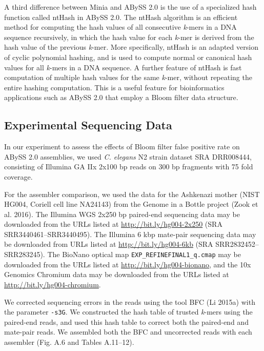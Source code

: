 \documentclass[
  12pt,
  oneside,
  openany]{book}
\begin{document}
A third difference between Minia and ABySS 2.0 is the use of a specialized hash function called ntHash in ABySS 2.0. The ntHash algorithm is an efficient method for computing the hash values of all consecutive \emph{k}-mers in a DNA sequence recursively, in which the hash value for each \emph{k}-mer is derived from the hash value of the previous \emph{k}-mer. More specifically, ntHash is an adapted version of cyclic polynomial hashing, and is used to compute normal or canonical hash values for all \emph{k}-mers in a DNA sequence. A further feature of ntHash is fast computation of multiple hash values for the same \emph{k}-mer, without repeating the entire hashing computation. This is a useful feature for bioinformatics applications such as ABySS 2.0 that employ a Bloom filter data structure.

\hypertarget{experimental-sequencing-data}{%
\subsection{Experimental Sequencing Data}\label{experimental-sequencing-data}}

In our experiment to assess the effects of Bloom filter false positive rate on ABySS 2.0 assemblies, we used \emph{C. elegans} N2 strain dataset SRA DRR008444, consisting of Illumina GA IIx 2x100 bp reads on 300 bp fragments with 75 fold coverage.

For the assembler comparison, we used the data for the Ashkenazi mother (NIST HG004, Coriell cell line NA24143) from the Genome in a Bottle project (Zook et al. 2016). The Illumina WGS 2x250 bp paired-end sequencing data may be downloaded from the URLs listed at \url{http://bit.ly/hg004-2x250} (SRA SRR3440461--SRR3440495). The Illumina 6 kbp mate-pair sequencing data may be downloaded from URLs listed at \url{http://bit.ly/hg004-6kb} (SRA SRR2832452--SRR283245). The BioNano optical map \texttt{EXP\_REFINEFINAL1\_q.cmap} may be downloaded from the URLs listed at \url{http://bit.ly/hg004-bionano}, and the 10x Genomics Chromium data may be downloaded from the URLs listed at \url{http://bit.ly/hg004-chromium}.

We corrected sequencing errors in the reads using the tool BFC (Li 2015a) with the parameter \texttt{-s3G}. We constructed the hash table of trusted \emph{k}-mers using the paired-end reads, and used this hash table to correct both the paired-end and mate-pair reads. We assembled both the BFC and uncorrected reads with each assembler (Fig. A.6 and Tables A.11--12).
\end{document}
